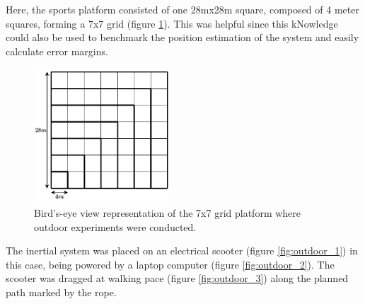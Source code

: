 Here, the sports platform consisted of one 28mx28m square, composed of 4 meter squares, forming a 7x7 grid (figure \ref{fig:platform_representation}). This was helpful since this kNowledge could also be used to benchmark the position estimation of the system and easily calculate error margins.

\begin{figure}[!h]
  \centering
  \includegraphics[width=0.45\textwidth]{figures/square.pdf}
  \caption{ Bird's-eye view representation of the 7x7 grid platform where outdoor experiments were conducted. }
  \label{fig:platform_representation}
\end{figure}





The inertial system was placed on an electrical scooter (figure \ref{fig:outdoor_1}) in this case, being powered by a laptop computer (figure \ref{fig:outdoor_2}). The scooter was dragged at walking pace (figure \ref{fig:outdoor_3}) along the planned path marked by the rope.

